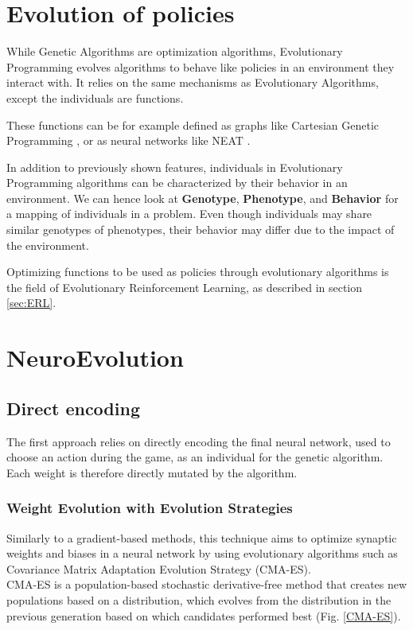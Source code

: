 \section{Evolution of policies}

While Genetic Algorithms are optimization algorithms, Evolutionary Programming evolves algorithms to behave like policies in an environment they interact with. It relies on the same mechanisms as Evolutionary Algorithms, except the individuals are functions. 

These functions can be for example defined as graphs like Cartesian Genetic Programming \cite{CGP}, or as neural networks like NEAT \cite{NEAT_1}.

In addition to previously shown features, individuals in Evolutionary Programming algorithms can be characterized by their behavior in an environment. We can hence look at \textbf{Genotype}, \textbf{Phenotype}, and \textbf{Behavior} for a mapping of individuals in a problem. Even though individuals may share similar genotypes of phenotypes, their behavior may differ due to the impact of the environment. 

Optimizing functions to be used as policies through evolutionary algorithms is the field of Evolutionary Reinforcement Learning, as described in section \ref{sec:ERL}.

\section{NeuroEvolution}
\subsection{Direct encoding}
The first approach relies on directly encoding the final neural network, used to choose an action during the game, as an individual for the genetic algorithm. Each weight is therefore directly mutated by the algorithm.

\subsubsection{Weight Evolution with Evolution Strategies}
Similarly to a gradient-based methods, this technique aims to optimize synaptic weights and biases in a neural network by using evolutionary algorithms such as Covariance Matrix Adaptation Evolution Strategy (CMA-ES). \cite{CMA-ES} \cite{CMAES-Atari}\\ 
CMA-ES is a population-based stochastic derivative-free method that creates new populations based on a distribution, which evolves from the distribution in the previous generation based on which candidates performed best (Fig. \ref{CMA-ES}).

